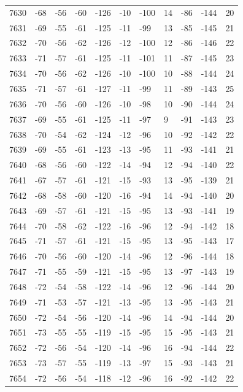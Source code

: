 \begin{table}[H]
\begin{tabular}{lllllllllll}
7630 & -68 & -56 & -60 & -126 & -10 & -100 & 14 & -86 & -144 & 20 \\
7631 & -69 & -55 & -61 & -125 & -11 & -99 & 13 & -85 & -145 & 21 \\
7632 & -70 & -56 & -62 & -126 & -12 & -100 & 12 & -86 & -146 & 22 \\
7633 & -71 & -57 & -61 & -125 & -11 & -101 & 11 & -87 & -145 & 23 \\
7634 & -70 & -56 & -62 & -126 & -10 & -100 & 10 & -88 & -144 & 24 \\
7635 & -71 & -57 & -61 & -127 & -11 & -99 & 11 & -89 & -143 & 25 \\
7636 & -70 & -56 & -60 & -126 & -10 & -98 & 10 & -90 & -144 & 24 \\
7637 & -69 & -55 & -61 & -125 & -11 & -97 & 9 & -91 & -143 & 23 \\
7638 & -70 & -54 & -62 & -124 & -12 & -96 & 10 & -92 & -142 & 22 \\
7639 & -69 & -55 & -61 & -123 & -13 & -95 & 11 & -93 & -141 & 21 \\
7640 & -68 & -56 & -60 & -122 & -14 & -94 & 12 & -94 & -140 & 22 \\
7641 & -67 & -57 & -61 & -121 & -15 & -93 & 13 & -95 & -139 & 21 \\
7642 & -68 & -58 & -60 & -120 & -16 & -94 & 14 & -94 & -140 & 20 \\
7643 & -69 & -57 & -61 & -121 & -15 & -95 & 13 & -93 & -141 & 19 \\
7644 & -70 & -58 & -62 & -122 & -16 & -96 & 12 & -94 & -142 & 18 \\
7645 & -71 & -57 & -61 & -121 & -15 & -95 & 13 & -95 & -143 & 17 \\
7646 & -70 & -56 & -60 & -120 & -14 & -96 & 12 & -96 & -144 & 18 \\
7647 & -71 & -55 & -59 & -121 & -15 & -95 & 13 & -97 & -143 & 19 \\
7648 & -72 & -54 & -58 & -122 & -14 & -96 & 12 & -96 & -144 & 20 \\
7649 & -71 & -53 & -57 & -121 & -13 & -95 & 13 & -95 & -143 & 21 \\
7650 & -72 & -54 & -56 & -120 & -14 & -96 & 14 & -94 & -144 & 20 \\
7651 & -73 & -55 & -55 & -119 & -15 & -95 & 15 & -95 & -143 & 21 \\
7652 & -72 & -56 & -54 & -120 & -14 & -96 & 16 & -94 & -144 & 22 \\
7653 & -73 & -57 & -55 & -119 & -13 & -97 & 15 & -93 & -143 & 21 \\
7654 & -72 & -56 & -54 & -118 & -12 & -96 & 16 & -92 & -142 & 22 \\

\end{tabular}
\end{table}
